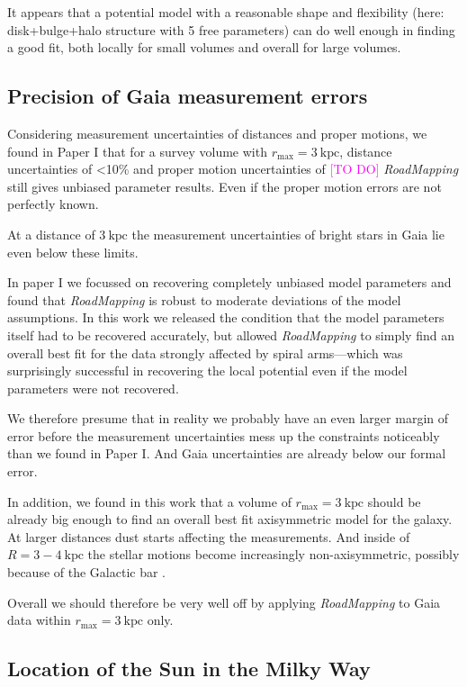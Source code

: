 \documentclass[iop,revtex4,numberedappendix,appendixfloats]{emulateapj}
\newcommand{\RM}{{\sl RoadMapping}}
\newcommand{\Wilma}[1]{\textcolor{Magenta}{#1}}
\begin{document}
It appears that a potential model with a reasonable shape and flexibility (here: disk+bulge+halo structure with 5 free parameters) can do well enough in finding a good fit, both locally for small volumes and overall for large volumes.

\subsection{Precision of Gaia measurement errors}

Considering measurement uncertainties of distances and proper motions, we found in Paper I that for a survey volume with $r_\text{max} = 3~\text{kpc}$, distance uncertainties of <10\% and proper motion uncertainties of \Wilma{[TO DO]} \RM{} still gives unbiased parameter results. Even if the proper motion errors are not perfectly known. 

At a distance of $3~\text{kpc}$ the measurement uncertainties of bright stars in Gaia lie even below these limits. 

In paper I we focussed on recovering completely unbiased model parameters and found that \RM{} is robust to moderate deviations of the model assumptions. In this work we released the condition that the model parameters itself had to be recovered accurately, but allowed \RM{} to simply find an overall best fit for the data strongly affected by spiral arms---which was surprisingly successful in recovering the local potential even if the model parameters were not recovered. 

We therefore presume that in reality we probably have an even larger margin of error before the measurement uncertainties mess up the constraints noticeably than we found in Paper I. And Gaia uncertainties are already below our formal error.

In addition, we found in this work that a volume of $r_\text{max} = 3~\text{kpc}$ should be already big enough to find an overall best fit axisymmetric model for the galaxy. At larger distances dust starts affecting the measurements. And inside of $R=3-4~\text{kpc}$ the stellar motions become increasingly non-axisymmetric, possibly because  of the Galactic bar \citep{2014ApJ...783..130R}.

Overall we should therefore be very well off by applying \RM{} to Gaia data within $r_\text{max}=3~\text{kpc}$ only.

\subsection{Location of the Sun in the Milky Way} \label{sec:discussion_sun_location}
\end{document}
